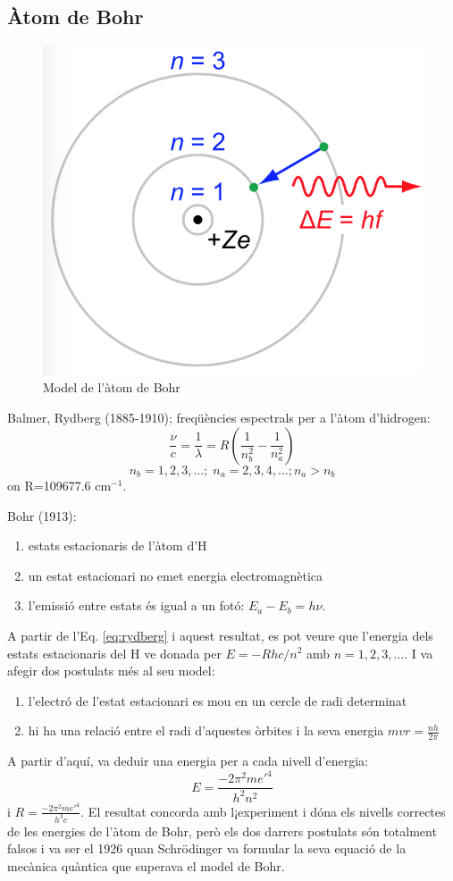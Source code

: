 \subsection{Àtom de Bohr}
\begin{figure}[h]
\centering
\includegraphics[scale=0.7]{figures/Bohr.png}
\caption{Model de l'àtom de Bohr}
\label{fig:Bohr}
\end{figure}
Balmer, Rydberg (1885-1910); freqüències espectrals per a l'àtom d'hidrogen:
\begin{equation}
\frac{\nu}{c}=\frac{1}{\lambda}=R\left( \frac{1}{n_b^2}-\frac{1}{n_a^2}\right)
\label{eq:rydberg}
\end{equation}
\[
n_b=1,2,3,\dots; \; n_a=2,3,4,\dots; n_a>n_b
\]
on R=109677.6 cm$^{-1}$.

Bohr (1913):
\begin{enumerate}
\item estats estacionaris de l'àtom d'H
\item un estat estacionari no emet energia electromagnètica
\item l'emissió entre estats és igual a un fotó: $E_a-E_b=h\nu$.
\end{enumerate}
A partir de l'Eq. \ref{eq:rydberg} i aquest resultat, es pot veure que l'energia dels estats estacionaris del H ve donada per $E=-Rhc/n^2$ amb $n=1,2,3,\dots$. I va afegir dos postulats més al seu model:
\begin{enumerate}
\item l'electró de l'estat estacionari es mou en un cercle de radi determinat
\item hi ha una relació entre el radi d'aquestes òrbites i la seva energia $mvr=\frac{nh}{2\pi}$
\end{enumerate}
A partir d'aquí, va deduir una energia per a cada nivell d'energia:
\[
E=\frac{-2\pi^2 m e'^4}{h^2n^2}
\]
i $R=\frac{-2\pi^2 m e'^4}{h^3c}$. El resultat concorda amb l¡experiment i dóna els nivells correctes de les energies de l'àtom de Bohr, però els dos darrers postulats són totalment falsos i va ser el 1926 quan Schrödinger va formular la seva equació de la mecànica quàntica que superava el model de Bohr.

